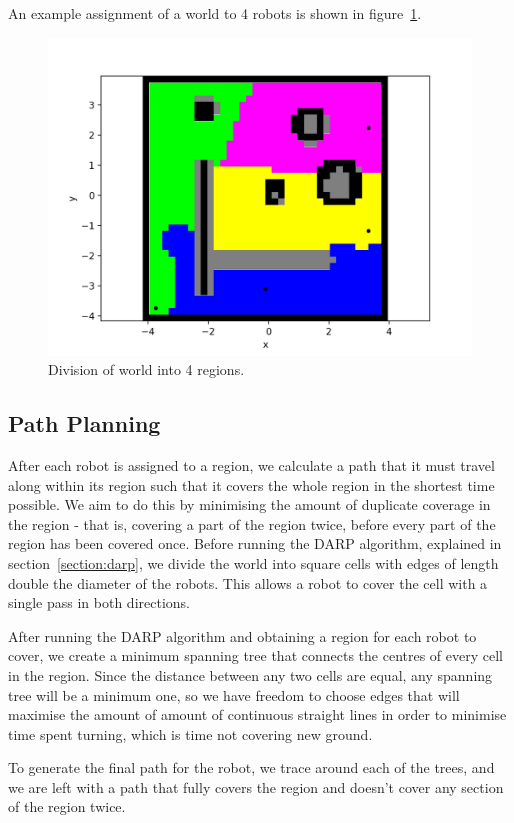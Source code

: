 \documentclass[a4paper, 10pt, conference]{ieeeconf}      %
\begin{document}
An example assignment of a world to 4 robots is shown in figure~\ref{fig:darp}.

\begin{figure}
	\centering
	\includegraphics[width=0.8\columnwidth]{figure_darp.png}
	\caption{Division of world into 4 regions.}
	\label{fig:darp}
\end{figure}
   
\subsection{Path Planning}
After each robot is assigned to a region, we calculate a path that it must travel along within its region such that it covers the whole region in the shortest time possible. We aim to do this by minimising the amount of duplicate coverage in the region - that is, covering a part of the region twice, before every part of the region has been covered once. Before running the DARP algorithm, explained in section~\ref{section:darp}, we divide the world into square cells with edges of length double the diameter of the robots. This allows a robot to cover the cell with a single pass in both directions.

After running the DARP algorithm and obtaining a region for each robot to cover, we create a minimum spanning tree that connects the centres of every cell in the region. Since the distance between any two cells are equal, any spanning tree will be a minimum one, so we have freedom to choose edges that will maximise the amount of amount of continuous straight lines in order to minimise time spent turning, which is time not covering new ground. 

To generate the final path for the robot, we trace around each of the trees, and we are left with a path that fully covers the region and doesn't cover any section of the region twice.
\end{document}
